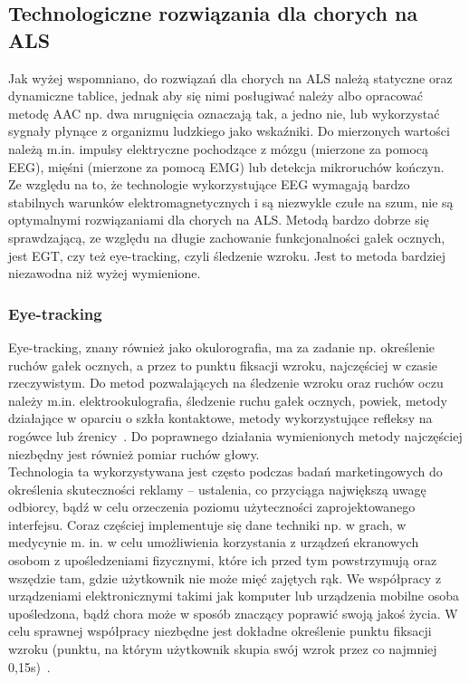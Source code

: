 \documentclass[twoside,a4paper]{book}
\begin{document}
\subsection{Technologiczne rozwiązania dla chorych na ALS}

Jak wyżej wspomniano, do rozwiązań dla chorych na ALS należą statyczne oraz dynamiczne tablice, jednak aby się nimi posługiwać należy albo opracować metodę AAC  np. dwa mrugnięcia oznaczają tak, a jedno nie, lub wykorzystać sygnały płynące z organizmu ludzkiego jako wskaźniki. Do mierzonych wartości należą m.in. impulsy elektryczne pochodzące z mózgu (mierzone za pomocą EEG), mięśni (mierzone za pomocą EMG) lub detekcja mikroruchów kończyn.~\cite{eyemouse} Ze względu na to, że technologie wykorzystujące  EEG wymagają bardzo stabilnych warunków elektromagnetycznych i są niezwykle czułe na szum, nie są optymalnymi rozwiązaniami dla chorych na ALS. Metodą bardzo dobrze się sprawdzającą, ze względu na długie zachowanie funkcjonalności gałek ocznych, jest EGT, czy też eye-tracking, czyli śledzenie wzroku. Jest to metoda bardziej niezawodna niż wyżej wymienione. 
\subsubsection{Eye-tracking} 

Eye-tracking, znany również jako okulorografia,  ma za zadanie np. określenie ruchów gałek ocznych, a przez to  punktu fiksacji wzroku,  najczęściej w czasie rzeczywistym. Do metod pozwalających na śledzenie wzroku oraz ruchów oczu należy m.in. elektrookulografia, śledzenie ruchu gałek ocznych, powiek, metody działające w oparciu o szkła kontaktowe, metody wykorzystujące refleksy na rogówce lub źrenicy~\cite{eyemouse}. Do poprawnego działania wymienionych metody najczęściej niezbędny jest również pomiar ruchów głowy.
\\ Technologia ta wykorzystywana jest często podczas badań marketingowych do określenia skuteczności reklamy – ustalenia, co przyciąga największą uwagę odbiorcy, bądź w celu orzeczenia poziomu użyteczności zaprojektowanego interfejsu.
Coraz częściej implementuje się dane techniki  np. w grach,  w medycynie m. in. w celu umożliwienia korzystania z urządzeń ekranowych osobom z upośledzeniami fizycznymi, które ich przed tym powstrzymują oraz wszędzie tam, gdzie użytkownik nie może mięć zajętych rąk. We współpracy z urządzeniami elektronicznymi takimi jak  komputer lub urządzenia mobilne osoba upośledzona, bądź chora może w sposób znaczący poprawić swoją jakoś życia. W celu sprawnej współpracy niezbędne jest dokładne określenie punktu fiksacji wzroku (punktu, na którym użytkownik skupia swój wzrok przez co najmniej 0,15s)~\cite{kunkaUwaga}. 
\end{document}
